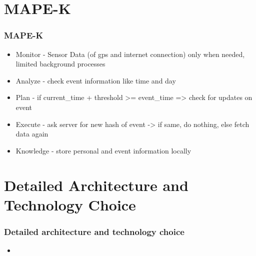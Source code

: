 \documentclass[aspectratio=169]{beamer}
\begin{document}
\section{MAPE-K}
\begin{frame}   
	\frametitle{MAPE-K}
	\begin{itemize}
		\item Monitor - Sensor Data (of gps and internet connection) only when needed, limited background processes
    		\item Analyze - check event information like time and day 
    		\item Plan - if current\_time + threshold >= event\_time => check for updates on event
    		\item Execute - ask server for new hash of event -> if same, do nothing, else fetch data again
    		\item Knowledge - store personal and event information locally
	\end{itemize}
\end{frame}




\section{Detailed Architecture and Technology Choice}
\begin{frame}
	\frametitle{Detailed architecture and technology choice}
	\begin{itemize}
		\item 
	\end{itemize}
\end{frame}
\end{document}
